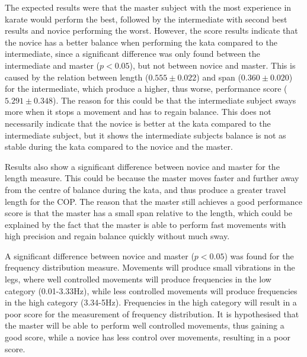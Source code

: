 
The expected results were that the master subject with the most experience in karate would perform the best, followed by the intermediate with second best results and novice performing the worst. However, the score results indicate that the novice has a better balance when performing the kata compared to the intermediate, since a significant difference was only found between the intermediate and master ($p<0.05$), but not between novice and master. This is caused by the relation between length ($0.555 \pm 0.022$) and span ($0.360 \pm 0.020$) for the intermediate, which produce a higher, thus worse, performance score ($5.291 \pm 0.348$). The reason for this could be that the intermediate subject sways more when it stops a movement and has to regain balance. This does not necessarily indicate that the novice is better at the kata compared to the intermediate subject, but it shows the intermediate subjects balance is not as stable during the kata compared to the novice and the master.

Results also show a significant difference between novice and master for the length measure. This could be because the master moves faster and further away from the centre of balance during the kata, and thus produce a greater travel length for the COP. 
The reason that the master still achieves a good performance score is that the master has a small span relative to the length, which could be explained by the fact that the master is able to perform fast movements with high precision and regain balance quickly without much sway. 

A significant difference between novice and master ($p<0.05$) was found for the frequency distribution measure. Movements will produce small vibrations in the legs, where well controlled movements will produce frequencies in the low category (0.01-3.33Hz), while less controlled movements will produce frequencies in the high category (3.34-5Hz). Frequencies in the high category will result in a poor score for the measurement of frequency distribution. It is hypothesised that the master will be able to perform well controlled movements, thus gaining a good score, while a novice has less control over movements, resulting in a poor score. 


